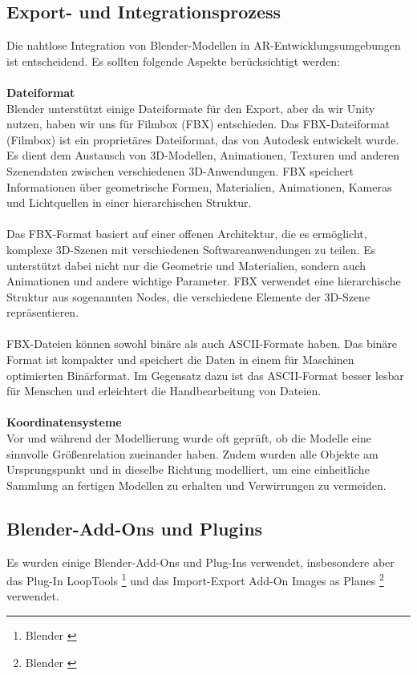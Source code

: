 \subsection{Export- und Integrationsprozess}
Die nahtlose Integration von Blender-Modellen in AR-Entwicklungsumgebungen ist entscheidend. Es sollten folgende
Aspekte berücksichtigt werden:\\
\\
\textbf{Dateiformat}\\
Blender unterstützt einige Dateiformate für den Export, aber da wir Unity nutzen, haben wir uns für Filmbox (FBX)
entschieden. Das FBX-Dateiformat (Filmbox) ist ein proprietäres Dateiformat, das von Autodesk entwickelt
wurde. Es dient dem Austausch von 3D-Modellen, Animationen, Texturen und anderen Szenendaten zwischen verschiedenen
3D-Anwendungen. FBX speichert Informationen über geometrische Formen, Materialien, Animationen, Kameras und
Lichtquellen in einer hierarchischen Struktur.\\
\\
Das FBX-Format basiert auf einer offenen Architektur, die es ermöglicht, komplexe 3D-Szenen mit verschiedenen
Softwareanwendungen zu teilen. Es unterstützt dabei nicht nur die Geometrie und Materialien, sondern auch Animationen
und andere wichtige Parameter. FBX verwendet eine hierarchische Struktur aus sogenannten Nodes, die verschiedene
Elemente der 3D-Szene repräsentieren.\\
\\
FBX-Dateien können sowohl binäre als auch ASCII-Formate haben. Das binäre Format ist kompakter und speichert die
Daten in einem für Maschinen optimierten Binärformat. Im Gegensatz dazu ist das ASCII-Format besser lesbar für
Menschen und erleichtert die Handbearbeitung von Dateien.\\
\\
\textbf{Koordinatensysteme}\\
Vor und während der Modellierung wurde oft geprüft, ob die Modelle eine sinnvolle Größenrelation zueinander haben.
Zudem wurden alle Objekte am Ursprungspunkt und in dieselbe Richtung modelliert, um eine einheitliche Sammlung an
fertigen Modellen zu erhalten und Verwirrungen zu vermeiden.


\subsection{Blender-Add-Ons und Plugins}
Es wurden einige Blender-Add-Ons und Plug-Ins verwendet, insbesondere aber das Plug-In LoopTools \footnote{Blender \cite{LoopTools}}
und das Import-Export Add-On Images as Planes \footnote{Blender \cite{Images as Planes}} verwendet.

